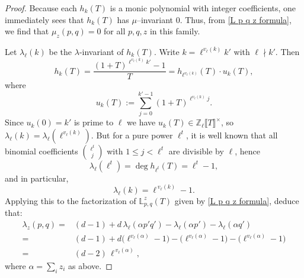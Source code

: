\documentclass[table]{amsart}
\numberwithin{equation}{section}
\begin{document}
\begin{proof}Because each $h_k(T)$ is a monic polynomial with integer coefficients, one immediately sees that $h_k(T)$ has $\mu$--invariant $0$.
Thus, from \eqref{L p q z formula}, we find that $\mu_z(p,q)=0$ for all $p,q,z$ in this family.

\par Let $\lambda_\ell(k)$ be the $\lambda$-invariant of $h_k(T)$. Write $k=\ell^{v_\ell(k)} k'$ with $\ell\nmid k'$.  Then
\[
h_k(T)
= \frac{(1+T)^{\ell^{v_\ell(k)}k'}-1}{T}
= h_{\ell^{v_\ell(k)}}(T)\cdot u_k(T),
\]
where
\[
u_k(T):=\sum_{j=0}^{k'-1} (1+T)^{\ell^{v_\ell(k)}j}.
\]
Since $u_k(0)=k'$ is prime to $\ell$ we have $u_k(T)\in\mathbb{Z}_\ell\llbracket T\rrbracket^\times$,
so $\lambda_\ell(k)=\lambda_\ell(\ell^{v_\ell(k)})$.  But for a pure power
$\ell^t$, it is well known that all binomial coefficients $\binom{\ell^t}{j}$ with
$1\le j<\ell^t$ are divisible by $\ell$, hence
\[
\lambda_\ell(\ell^t)=\deg h_{\ell^t}(T)=\ell^t-1,
\]
and in particular,
\[
\lambda_\ell(k)=\ell^{\,v_\ell(k)}-1.
\]
Applying this to the factorization of $\mathbb{L}_{p,q}^z(T)$ given by \eqref{L p q z formula}, deduce that:
\[
\begin{split}\lambda_z(p,q)
=& (d-1) + d\,\lambda_\ell(\alpha p'q') 
- \lambda_\ell(\alpha p') - \lambda_\ell(\alpha q')\\
= & (d-1) + d\big(\ell^{v_\ell(\alpha)}-1\big) 
- \big(\ell^{v_\ell(\alpha)}-1\big) - \big(\ell^{v_\ell(\alpha)}-1\big)\\
= & (d-2)\,\ell^{\,v_\ell(\alpha)} ,
\end{split}\]
\noindent where $\alpha=\sum_i z_i$ as above.
\end{proof}







\end{document}
